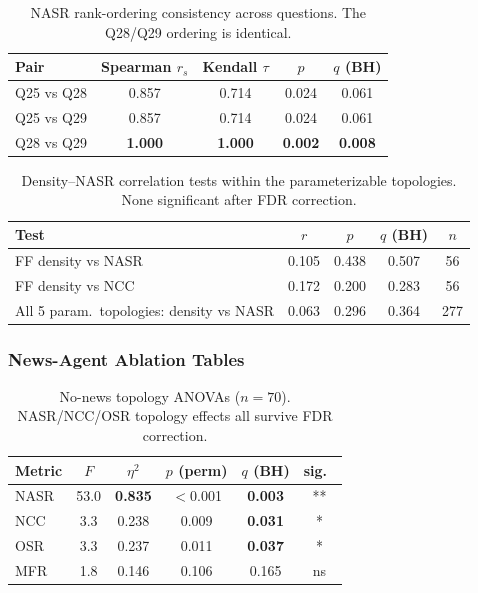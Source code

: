 \documentclass[11pt]{article}
\begin{document}
\begin{table}[h]
\centering
\small
\begin{tabular}{lcccc}
\toprule
Pair & Spearman $r_s$ & Kendall $\tau$ & $p$ & $q$ (BH) \\
\midrule
Q25 vs Q28 & 0.857 & 0.714 & 0.024 & 0.061 \\
Q25 vs Q29 & 0.857 & 0.714 & 0.024 & 0.061 \\
Q28 vs Q29 & \textbf{1.000} & \textbf{1.000} & \textbf{0.002} & \textbf{0.008} \\
\bottomrule
\end{tabular}
\caption{NASR rank-ordering consistency across questions. The Q28/Q29 ordering is identical.}
\label{tab:phase3_rank_questions}
\end{table}

\begin{table}[h]
\centering
\small
\begin{tabular}{lcccc}
\toprule
Test & $r$ & $p$ & $q$ (BH) & $n$ \\
\midrule
FF density vs NASR                          & 0.105 & 0.438 & 0.507 & 56 \\
FF density vs NCC                           & 0.172 & 0.200 & 0.283 & 56 \\
All 5 param.\ topologies: density vs NASR   & 0.063 & 0.296 & 0.364 & 277 \\
\bottomrule
\end{tabular}
\caption{Density--NASR correlation tests within the parameterizable topologies. None significant after FDR correction.}
\label{tab:phase3_density_corr}
\end{table}

\subsubsection{News-Agent Ablation Tables}

\begin{table}[h]
\centering
\small
\begin{tabular}{lccccc}
\toprule
Metric & $F$ & $\eta^2$ & $p$ (perm) & $q$ (BH) & sig.\ \\
\midrule
NASR & 53.0 & \textbf{0.835} & $<$0.001 & \textbf{0.003} & ** \\
NCC  &  3.3 & 0.238          & 0.009    & \textbf{0.031} & * \\
OSR  &  3.3 & 0.237          & 0.011    & \textbf{0.037} & * \\
MFR  &  1.8 & 0.146          & 0.106    & 0.165          & ns \\
\bottomrule
\end{tabular}
\caption{No-news topology ANOVAs ($n=70$). NASR/NCC/OSR topology effects all survive FDR correction.}
\label{tab:phase3_nonews_anova}
\end{table}
\end{document}
